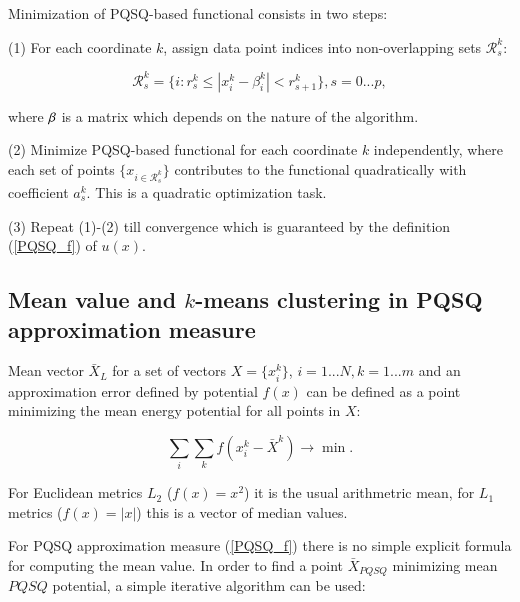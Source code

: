 \documentclass[preprint,12pt]{elsarticle}
\makeatletter
\def\BState{\State\hskip-\ALG@thistlm}
\makeatother
\begin{document}
Minimization of PQSQ-based functional consists in two steps:

(1) For each coordinate $k$, assign data point indices into non-overlapping sets $\mathcal{R}_s^k$:

\begin{equation}
\mathcal{R}_s^k= \{i: r_{s}^k \leq |x_i^k-\beta^k_i| < r_{s+1}^k\}, s = 0...p,
\end{equation}

\noindent where $\bf{\beta}$ is a matrix which depends on the nature of the algorithm.

(2) Minimize PQSQ-based functional for each coordinate $k$ independently, where each set of points $\{x_{i\in \mathcal{R}_s^k}\}$ contributes
to the functional quadratically with coefficient $a_s^k$. This is a quadratic optimization task.

(3) Repeat (1)-(2) till convergence which is guaranteed by the definition (\ref{PQSQ_f}) of $u(x)$.


\subsection{Mean value and $k$-means clustering in PQSQ approximation measure}

Mean vector $\bar{X}_L$  for a set of vectors $X=\{x_i^k\}$, $i=1...N, k=1...m$ and an approximation error defined by potential $f(x)$ can be defined as a point minimizing the mean energy potential for all points in  $X$:

\begin{equation}
\sum_i\sum_k f(x_i^k-\bar{X}^k) \rightarrow \min.
\end{equation}

For Euclidean metrics $L_2$ ($f(x)=x^2$) it is the usual arithmetric mean, for $L_1$ metrics ($f(x)=|x|$) this is a vector of median values.

For PQSQ approximation measure (\ref{PQSQ_f}) there is no simple explicit formula for computing the mean value.  In order to find a point $\bar{X}_{PQSQ}$ minimizing mean $PQSQ$ potential, a simple iterative algorithm can be used:

\end{document}
